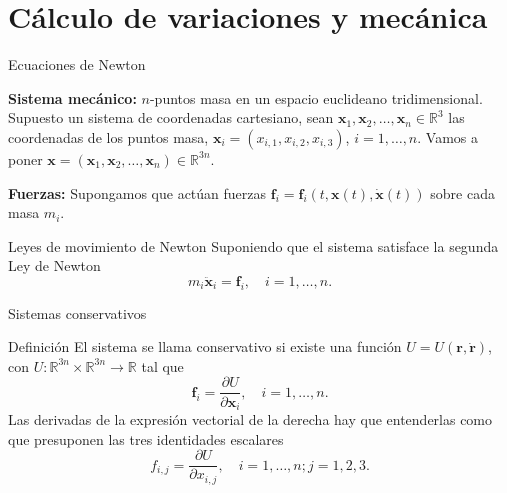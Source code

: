 \documentclass[handout,hyperref={colorlinks=true}]{beamer}
\newcommand{\rr}{\mathbb{R}}
\renewcommand{\b}[1]{\boldsymbol{#1}}
\begin{document}
\section{Cálculo de variaciones y mecánica}
\begin{frame}{Ecuaciones de Newton}


\textbf{Sistema mecánico:} $n$-puntos masa en un espacio euclideano tridimensional. Supuesto un sistema de coordenadas cartesiano, sean $\b{x}_1,\b{x}_2,\ldots,\b{x}_n\in\rr^3$ las coordenadas de los puntos masa, $\b{x}_i=(x_{i,1},x_{i,2},x_{i,3})$, $i=1,\ldots,n$. Vamos a poner $\b{x}= (\b{x}_1,\b{x}_2,\ldots,\b{x}_n)\in\rr^{3n}$.

\textbf{Fuerzas:}  Supongamos que actúan fuerzas $\b{f}_i=\b{f}_i(t,\b{x}(t),\b{\dot{x}}(t))$ sobre cada masa $m_i$.

\begin{block}{Leyes de movimiento de Newton} Suponiendo que el sistema satisface la segunda Ley de Newton 
\[m_i\b{\ddot{x}}_i=\b{f}_i,\quad i=1,\ldots ,n.\] 
\end{block}


\end{frame}

\begin{frame}{Sistemas conservativos}

\begin{block}{Definición} El sistema se llama conservativo si existe una función $U=U(\b{r},\b{\dot{r}})$, con  $U:\rr^{3n}\times \rr^{3n}\to\rr$ tal que
\[\b{f}_i=\frac{\partial U}{\partial \b{x}_i},\quad i=1,\ldots,n.\]
Las derivadas de la expresión vectorial de la derecha hay que entenderlas como que presuponen las tres identidades escalares 
\[f_{i,j}=\frac{\partial U}{\partial x_{i,j}},\quad i=1,\ldots,n; j=1,2,3.\]

\end{block}

\end{frame}
\end{document}
